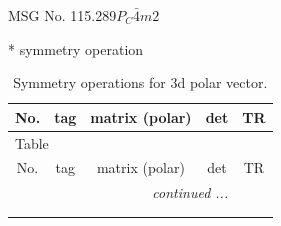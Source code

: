 \documentclass[fleqn,8pt]{jsarticle}
\begin{document}
\setcounter{MaxMatrixCols}{32}

\renewcommand{\tablename}{Table~}
\renewcommand{\figurename}{Figure~}
\begin{center}
\LARGE
MSG No. 115.289\quad$P_{C}\bar{4}m2$
\end{center}
* symmetry operation
\renewcommand{\arraystretch}{1.3}
\begin{longtable}{ccccc}
\caption{Symmetry operations for 3d polar vector.}
 \\
 \hline \hline
No. & tag & matrix (polar) & det & TR \\ \hline \endfirsthead

\multicolumn{4}{l}{\tablename\ \thetable{}} \\
 \hline \hline
No. & tag & matrix (polar) & det & TR \\ \hline \endhead

 \hline \hline
\multicolumn{4}{r}{\footnotesize\it continued ...} \\ \endfoot

 \hline \hline
\multicolumn{4}{r}{} \\ \endlastfoot


\end{longtable}
\end{document}
